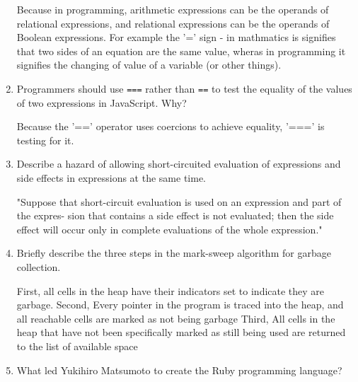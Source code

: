 \begin{enumerate}
  \begin{answer}

    Because in programming, arithmetic expressions can be the operands of relational expressions, and relational expressions can be the operands of Boolean expressions. For example the '=' sign - in mathmatics is signifies that two sides of an equation are the same value, wheras in programming it signifies the changing of value of a variable (or other things).

    \end{answer}

  \item Programmers should use \verb+===+ rather than \verb+==+ to
    test the equality of the values of two expressions in JavaScript. Why?

  \begin{answer}

    Because the '==' operator uses coercions to achieve equality, '===' is testing for it.

    \end{answer}

  \item Describe a hazard of allowing short-circuited evaluation
    of expressions and side effects in expressions at the same time.

  \begin{answer}

    "Suppose that short-circuit evaluation is used on an expression and part of the expres- sion that contains a side effect is not evaluated; then the side effect will occur only in complete evaluations of the whole expression."

    \end{answer}

  \item Briefly describe the three steps in the mark-sweep algorithm
    for garbage collection.

  \begin{answer}

    First, all cells in the heap have their indicators set to indicate they are garbage.
    Second, Every pointer in the program is traced into the heap, and all reachable cells are marked as not being garbage
    Third, All cells in the heap that have not been specifically marked as still being used are returned to the list of available space
    \end{answer}

  \item What led Yukihiro Matsumoto to create the Ruby programming language?


\end{enumerate}
